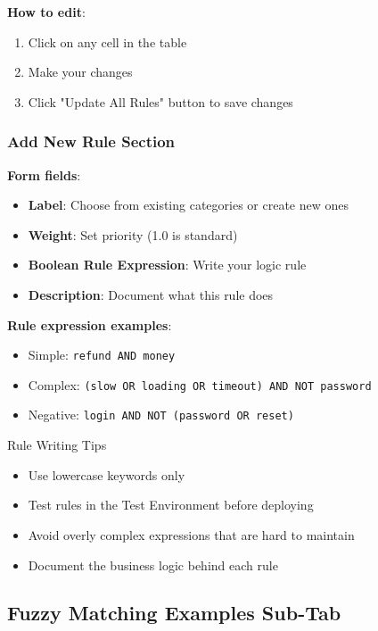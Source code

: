 \documentclass[11pt,a4paper]{article}
\begin{document}
\textbf{How to edit}:
\begin{enumerate}
    \item Click on any cell in the table
    \item Make your changes
    \item Click "Update All Rules" button to save changes
\end{enumerate}

\subsubsection{Add New Rule Section}
\textbf{Form fields}:
\begin{itemize}
    \item \textbf{Label}: Choose from existing categories or create new ones
    \item \textbf{Weight}: Set priority (1.0 is standard)
    \item \textbf{Boolean Rule Expression}: Write your logic rule
    \item \textbf{Description}: Document what this rule does
\end{itemize}

\textbf{Rule expression examples}:
\begin{itemize}
    \item Simple: \texttt{refund AND money}
    \item Complex: \texttt{(slow OR loading OR timeout) AND NOT password}
    \item Negative: \texttt{login AND NOT (password OR reset)}
\end{itemize}

\begin{warningbox}{Rule Writing Tips}
\begin{itemize}
    \item Use lowercase keywords only
    \item Test rules in the Test Environment before deploying
    \item Avoid overly complex expressions that are hard to maintain
    \item Document the business logic behind each rule
\end{itemize}
\end{warningbox}

\subsection{Fuzzy Matching Examples Sub-Tab}
\end{document}

